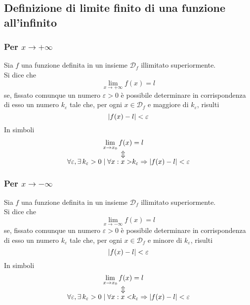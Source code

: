\subsection{Definizione di limite finito di una funzione all'infinito}
\subsubsection{Per $x\to+\infty$}
\begin{definizioneLimiteInfinitoFinito1}
	Sia $f$ una funzione definita in un insieme $\mathscr{D}_f$ illimitato superiormente.\\
	Si dice che
	\begin{equation*}
	\lim\limits_{x\to+\infty}f(x)=l
	\end{equation*}
	se, fissato comunque un numero $\varepsilon>0$ è possibile determinare in corrispondenza di esso 
	un numero $k_\varepsilon$ tale che, per ogni $x\in\mathscr{D}_f$ e maggiore di $k_\varepsilon$, 
	risulti
	\begin{equation*}
	\lvert f(x)-l\rvert<\varepsilon
	\end{equation*}
	In simboli
	\begin{align*}
	\lim\limits_{x\to x_0} f(x) &= l\\
	\ArrowBetweenLines
	\forall \varepsilon, \exists\,k_\varepsilon>0\mid\forall x: x>&k_\varepsilon \Rightarrow
	\vert f(x) - l\vert < \varepsilon
	\end{align*}
\end{definizioneLimiteInfinitoFinito1}
\subsubsection{Per $x\to-\infty$}
\begin{definizioneLimiteInfinitoFinito2}
	Sia $f$ una funzione definita in un insieme $\mathscr{D}_f$ illimitato superiormente.\\
	Si dice che
	\begin{equation*}
	\lim\limits_{x\to-\infty}f(x)=l
	\end{equation*}
	se, fissato comunque un numero $\varepsilon>0$ è possibile determinare in corrispondenza di esso 
	un numero $k_\varepsilon$ tale che, per ogni $x\in\mathscr{D}_f$ e minore di $k_\varepsilon$, 
	risulti
	\begin{equation*}
	\lvert f(x)-l\rvert<\varepsilon
	\end{equation*}
	In simboli
	\begin{align*}
	\lim\limits_{x\to x_0} f(x) &= l\\
	\ArrowBetweenLines
	\forall \varepsilon, \exists\,k_\varepsilon>0\mid\forall x: x<&k_\varepsilon \Rightarrow
	\vert f(x) - l\vert < \varepsilon
	\end{align*}
\end{definizioneLimiteInfinitoFinito2}

